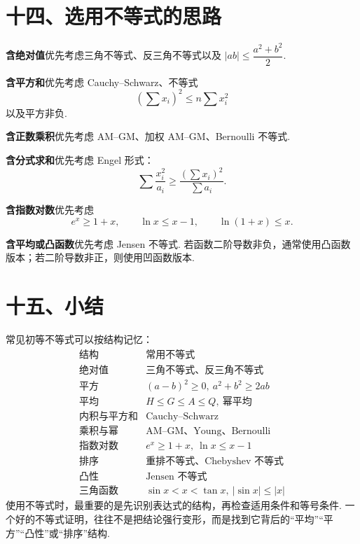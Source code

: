 \documentclass[UTF8,12pt,a4paper,fontset=fandol]{ctexart}
\begin{document}
\section*{十四、选用不等式的思路}

\noindent\textbf{含绝对值}\quad 优先考虑三角不等式、反三角不等式以及 $|ab|\le\dfrac{a^2+b^2}{2}$.

\noindent\textbf{含平方和}\quad 优先考虑 Cauchy--Schwarz、不等式
\[
  \left(\sum x_i\right)^2\le n\sum x_i^2
\]
以及平方非负.

\noindent\textbf{含正数乘积}\quad 优先考虑 AM--GM、加权 AM--GM、Bernoulli 不等式.

\noindent\textbf{含分式求和}\quad 优先考虑 Engel 形式：
\[
  \sum \frac{x_i^2}{a_i}\ge\frac{(\sum x_i)^2}{\sum a_i}.
\]

\noindent\textbf{含指数对数}\quad 优先考虑
\[
  e^x\ge1+x,\qquad \ln x\le x-1,\qquad \ln(1+x)\le x.
\]

\noindent\textbf{含平均或凸函数}\quad 优先考虑 Jensen 不等式. 若函数二阶导数非负，通常使用凸函数版本；若二阶导数非正，则使用凹函数版本.

\section*{十五、小结}

常见初等不等式可以按结构记忆：
\[
\begin{array}{c|c}
  \text{结构} & \text{常用不等式}\\ \hline
  \text{绝对值} & \text{三角不等式、反三角不等式}\\
  \text{平方} & (a-b)^2\ge0,\ a^2+b^2\ge2ab\\
  \text{平均} & H\le G\le A\le Q,\ \text{幂平均}\\
  \text{内积与平方和} & \text{Cauchy--Schwarz}\\
  \text{乘积与幂} & \text{AM--GM、Young、Bernoulli}\\
  \text{指数对数} & e^x\ge1+x,\ \ln x\le x-1\\
  \text{排序} & \text{重排不等式、Chebyshev 不等式}\\
  \text{凸性} & \text{Jensen 不等式}\\
  \text{三角函数} & \sin x<x<\tan x,\ |\sin x|\le|x|
\end{array}
\]
使用不等式时，最重要的是先识别表达式的结构，再检查适用条件和等号条件. 一个好的不等式证明，往往不是把结论强行变形，而是找到它背后的“平均”“平方”“凸性”或“排序”结构.
\end{document}

